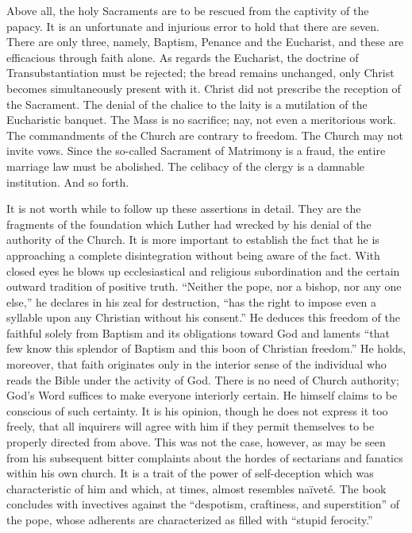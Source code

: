 Above all, the holy Sacraments are to be rescued from the captivity
of the papacy. It is an unfortunate and injurious error to hold that
there are seven. There are only three, namely, Baptism, Penance and
the Eucharist, and these are efficacious through faith alone. As regards
the Eucharist, the doctrine of Transubstantiation must be rejected;
the bread remains unchanged, only Christ becomes simultaneously present
with it. Christ did not prescribe the reception of the
Sacrament. The denial of the chalice to the laity is a mutilation of the
Eucharistic banquet. The Mass is no sacrifice; nay, not even a meritorious
work. The commandments of the Church are contrary to
freedom. The Church may not invite vows. Since the so-called Sacrament
of Matrimony is a fraud, the entire marriage law must be
abolished. The celibacy of the clergy is a damnable institution. And so
forth.

It is not worth while to follow up these assertions in detail. They
are the fragments of the foundation which Luther had wrecked by his
denial of the authority of the Church.
It is more important to establish the fact that he is approaching
a complete disintegration without being aware of the fact. With
closed eyes he blows up ecclesiastical and religious subordination and
the certain outward tradition of positive truth. “Neither the pope,
nor a bishop, nor any one else,” he declares in his zeal for destruction,
“has the right to impose even a syllable upon any Christian without
his consent.” He deduces this freedom of the faithful solely from
Baptism and its obligations toward God and laments “that few know
this splendor of Baptism and this boon of Christian freedom.” He
holds, moreover, that faith originates only in the interior sense of the
individual who reads the Bible under the activity of God. There is
no need of Church authority; God’s Word suffices to make everyone
interiorly certain. He himself claims to be conscious of such certainty.
It is his opinion, though he does not express it too freely, that all inquirers
will agree with him if they permit themselves to be properly
directed from above. This was not the case, however, as may be seen
from his subsequent bitter complaints about the hordes of sectarians
and fanatics within his own church. It is a trait of the power of self-deception
which was characteristic of him and which, at times, almost
resembles naïveté. The book concludes with invectives against the
“despotism, craftiness, and superstition” of the pope, whose adherents
are characterized as filled with “stupid ferocity.”

